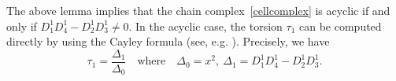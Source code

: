 \documentclass{amsart}
\renewcommand{\S}{\mathrm{S}}
\theoremstyle{definition}
\begin{document}
The above lemma implies that the chain complex~\eqref{cellcomplex} is acyclic if and only if $D^1_{1} D^1_{4}-D^1_{2} D^1_{3} \neq 0$. In the acyclic case, the torsion $\tau_1$ can be computed directly by using the Cayley formula (see, e.g. \cite[p.485]{GKZ}). Precisely, we have
\begin{equation}
\label{eqn.tau}
    \tau_1 = \frac{\Delta_1}{\Delta_0} \quad \text{where} \quad \Delta_0=x^2, \ \Delta_1=D^1_{1}D^1_{4} - D^1_{2} D^1_{3}.
\end{equation} 


\end{document}
